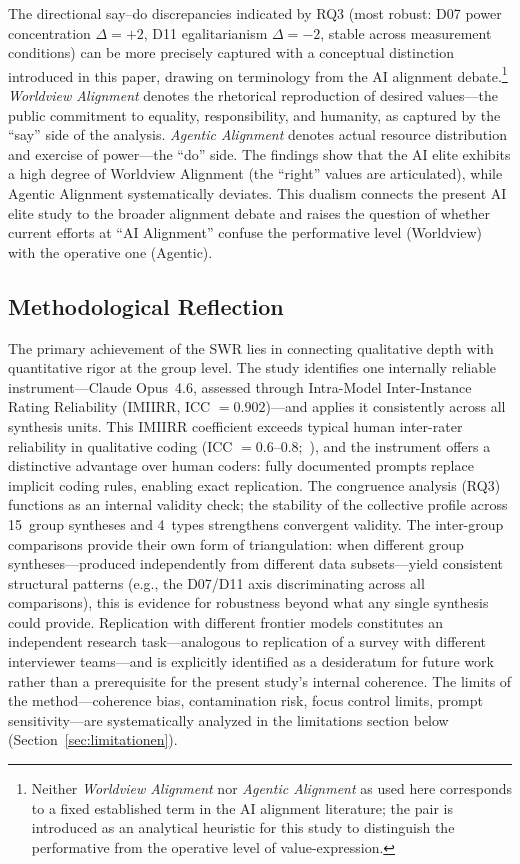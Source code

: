 \documentclass[12pt,a4paper]{article}
\begin{document}
The directional say--do discrepancies indicated by RQ3 (most robust: D07 power concentration $\Delta = +2$, D11 egalitarianism $\Delta = -2$, stable across measurement conditions) can be more precisely captured with a conceptual distinction introduced in this paper, drawing on terminology from the AI alignment debate.\footnote{Neither \emph{Worldview Alignment} nor \emph{Agentic Alignment} as used here corresponds to a fixed established term in the AI alignment literature; the pair is introduced as an analytical heuristic for this study to distinguish the performative from the operative level of value-expression.} \emph{Worldview Alignment} denotes the rhetorical reproduction of desired values---the public commitment to equality, responsibility, and humanity, as captured by the ``say'' side of the analysis. \emph{Agentic Alignment} denotes actual resource distribution and exercise of power---the ``do'' side. The findings show that the AI elite exhibits a high degree of Worldview Alignment (the ``right'' values are articulated), while Agentic Alignment systematically deviates. This dualism connects the present AI elite study to the broader alignment debate and raises the question of whether current efforts at ``AI Alignment'' confuse the performative level (Worldview) with the operative one (Agentic).


\subsection{Methodological Reflection}
\label{sec:diskussion:methodik}

The primary achievement of the SWR lies in connecting qualitative depth with quantitative rigor at the group level. The study identifies one internally reliable instrument---Claude Opus~4.6, assessed through Intra-Model Inter-Instance Rating Reliability (IMIIRR, ICC $= 0.902$)---and applies it consistently across all synthesis units. This IMIIRR coefficient exceeds typical human inter-rater reliability in qualitative coding (ICC $= 0.6$--$0.8$;~\citealt{Hallgren2012}), and the instrument offers a distinctive advantage over human coders: fully documented prompts replace implicit coding rules, enabling exact replication. The congruence analysis (RQ3) functions as an internal validity check; the stability of the collective profile across 15~group syntheses and 4~types strengthens convergent validity. The inter-group comparisons provide their own form of triangulation: when different group syntheses---produced independently from different data subsets---yield consistent structural patterns (e.g., the D07/D11 axis discriminating across all comparisons), this is evidence for robustness beyond what any single synthesis could provide. Replication with different frontier models constitutes an independent research task---analogous to replication of a survey with different interviewer teams---and is explicitly identified as a desideratum for future work rather than a prerequisite for the present study's internal coherence. The limits of the method---coherence bias, contamination risk, focus control limits, prompt sensitivity---are systematically analyzed in the limitations section below (Section~\ref{sec:limitationen}).
\end{document}
